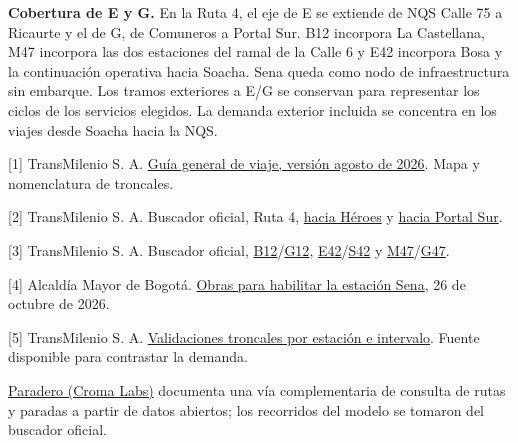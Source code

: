 \documentclass[11pt,letterpaper]{article}
\newcommand{\apartado}[1]{\par\vspace{3pt}{\sffamily\bfseries\color{azul}#1}\par\vspace{1pt}}
\begin{document}
\textbf{Cobertura de E y G.} En la Ruta 4, el eje de E se extiende de NQS Calle 75 a Ricaurte y el de G, de Comuneros a Portal Sur. B12 incorpora La Castellana, M47 incorpora las dos estaciones del ramal de la Calle 6 y E42 incorpora Bosa y la continuación operativa hacia Soacha. Sena queda como nodo de infraestructura sin embarque. Los tramos exteriores a E/G se conservan para representar los ciclos de los servicios elegidos. La demanda exterior incluida se concentra en los viajes desde Soacha hacia la NQS.

\apartado{Fuentes consultadas}
{\small
[1] TransMilenio S. A. \href{https://www.transmilenio.gov.co/comunicaciones/publicaciones/2024/guia-general-de-viaje-de-transmilenio}{Guía general de viaje, versión agosto de 2026}. Mapa y nomenclatura de troncales.

[2] TransMilenio S. A. Buscador oficial, Ruta 4, \href{https://buscador-rutas.transmilenio.gov.co/rutas/688/4/TransMilenio/H\%C3\%A9roes}{hacia Héroes} y \href{https://buscador-rutas.transmilenio.gov.co/rutas/687/4/TransMilenio/H\%C3\%A9roes\%20-\%20Portal\%20Sur\%20-\%20JFK\%20Coop.Financiera}{hacia Portal Sur}.

[3] TransMilenio S. A. Buscador oficial, \href{https://buscador-rutas.transmilenio.gov.co/rutas/349/B12/TransMilenio/P.\%20Norte}{B12}/\href{https://buscador-rutas.transmilenio.gov.co/rutas/350/G12/TransMilenio/P.\%20Sur}{G12}, \href{https://buscador-rutas.transmilenio.gov.co/rutas/1174/E42/TransMilenio/San\%20Mateo\%20-\%20C.C.\%20Unisur\%20-\%207\%20de\%20Agosto}{E42}/\href{https://buscador-rutas.transmilenio.gov.co/rutas/5653/S42/TransMilenio/San\%20Mateo}{S42} y \href{https://buscador-rutas.transmilenio.gov.co/rutas/384/M47/TransMilenio/Museo\%20Nacional}{M47}/\href{https://buscador-rutas.transmilenio.gov.co/rutas/385/G47/TransMilenio/Portal\%20Sur}{G47}.

[4] Alcaldía Mayor de Bogotá. \href{https://bogota.gov.co/mi-ciudad/movilidad/2026-10/obras-para-habilitar-la-estacion-de-transmilenio-del-sena-en-bogota}{Obras para habilitar la estación Sena}, 26 de octubre de 2026.

[5] TransMilenio S. A. \href{https://validaciones.datosabiertos.transmilenio.gov.co/validaciones_mensuales.html}{Validaciones troncales por estación e intervalo}. Fuente disponible para contrastar la demanda.

\href{https://github.com/croma-labs/paradero}{Paradero (Croma Labs)} documenta una vía complementaria de consulta de rutas y paradas a partir de datos abiertos; los recorridos del modelo se tomaron del buscador oficial.
}
\end{document}
